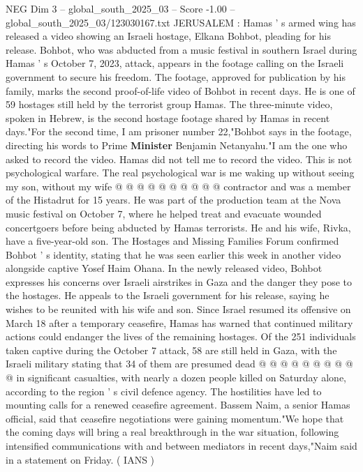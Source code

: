 \begin{textsample}{NEG Dim 3 – global\_south\_2025\_03 – Score -1.00 – global\_south\_2025\_03/123030167.txt}  \label{ex:f3_neg_422}
JERUSALEM : Hamas ' s armed wing has released a video showing an Israeli hostage, Elkana Bohbot, pleading for his release.
Bohbot, who was abducted from a music festival in southern Israel during Hamas ' s October 7, 2023, attack, appears in the footage calling on the Israeli government to secure his freedom.
The footage, approved for publication by his family, marks the second proof-of-life video of Bohbot in recent days.
He is one of 59 hostages still held by the terrorist group Hamas.
The three-minute video, spoken in Hebrew, is the second hostage footage shared by Hamas in recent days."For the second time, I am prisoner number 22,"Bohbot says in the footage, directing his words to Prime \textbf{Minister} Benjamin Netanyahu."I am the one who asked to record the video.
Hamas did not tell me to record the video.
This is not psychological warfare.
The real psychological war is me waking up without seeing my son, without my wife @ @ @ @ @ @ @ @ @ @ contractor and was a member of the Histadrut for 15 years.
He was part of the production team at the Nova music festival on October 7, where he helped treat and evacuate wounded concertgoers before being abducted by Hamas terrorists.
He and his wife, Rivka, have a five-year-old son.
The Hostages and Missing Families Forum confirmed Bohbot ' s identity, stating that he was seen earlier this week in another video alongside captive Yosef Haim Ohana.
In the newly released video, Bohbot expresses his concerns over Israeli airstrikes in Gaza and the danger they pose to the hostages.
He appeals to the Israeli government for his release, saying he wishes to be reunited with his wife and son.
Since Israel resumed its offensive on March 18 after a temporary ceasefire, Hamas has warned that continued military actions could endanger the lives of the remaining hostages.
Of the 251 individuals taken captive during the October 7 attack, 58 are still held in Gaza, with the Israeli military stating that 34 of them are presumed dead @ @ @ @ @ @ @ @ @ @ in significant casualties, with nearly a dozen people killed on Saturday alone, according to the region ' s civil defence agency.
The hostilities have led to mounting calls for a renewed ceasefire agreement.
Bassem Naim, a senior Hamas official, said that ceasefire negotiations were gaining momentum."We hope that the coming days will bring a real breakthrough in the war situation, following intensified communications with and between mediators in recent days,"Naim said in a statement on Friday. ( IANS )

\end{textsample}

